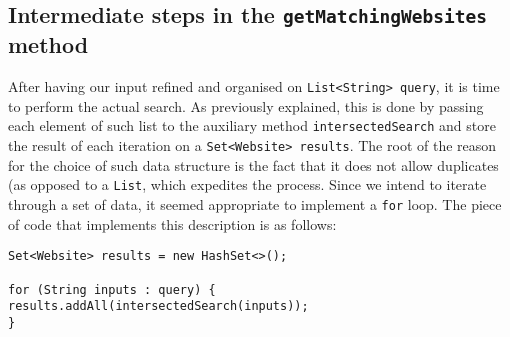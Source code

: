\subsection{Intermediate steps in the {\tt getMatchingWebsites} method}
After having our input refined and organised on {\tt List<String> query}, it is time to perform the actual search. As previously explained, this is done by passing each element of such list to the auxiliary method {\tt intersectedSearch} and store the result of each iteration on a {\tt Set<Website> results}. The root of the reason for the choice of such data structure is the fact that it does not allow duplicates (as opposed to a {\tt List}, which expedites the process. Since we intend to iterate through a set of data, it seemed appropriate to implement a {\tt for} loop. The piece of code that implements this description is as follows:
\begin{lstlisting}
Set<Website> results = new HashSet<>();

for (String inputs : query) {
results.addAll(intersectedSearch(inputs));
}
\end{lstlisting}
